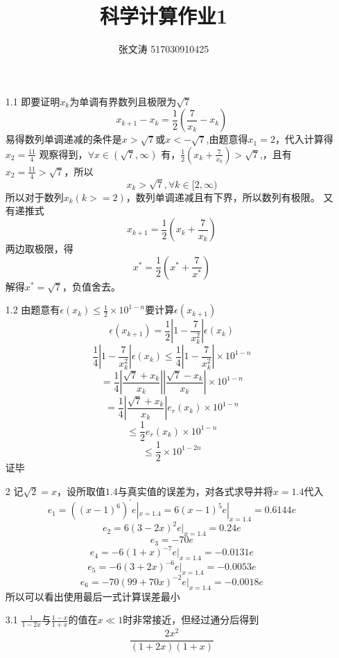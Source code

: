 \documentclass[UTF-8]{ctexart}
\title{科学计算作业1}
\author{张文涛 517030910425}
\begin{document}
	\maketitle
	\begin{itemize}
		\item[1.1]即要证明${x_k}$为单调有界数列且极限为$\sqrt{7}$\[ x_{k+1} - x_k  = \frac{1}{2}( \frac{7}{x_k} - x_k)\]
		易得数列单调递减的条件是$x>\sqrt{7}$或$x<-\sqrt{7}$,由题意得$x_1 = 2$，代入计算得$x_2 = \frac{11}{4}$\newline
		观察得到，$\forall x \in (\sqrt{7}, \infty)$ 有，$\frac{1}{2}(x_k +\frac{7}{x_k}) > \sqrt{7}$,，且有$x_2 = \frac{11}{4} > \sqrt{7}$，所以\[x_k > \sqrt{7}, \forall k \in [2, \infty)\]所以对于数列$x_k(k >= 2)$，数列单调递减且有下界，所以数列有极限。\newline
		又有递推式\[x_{k+1} = \frac{1}{2}(x_k + \frac{7}{x_k})\]
		两边取极限，得
		\[x^{*} = \frac{1}{2}(x^{*} +\frac{7}{x^{*}})\]
		解得$x^{*} = \sqrt{7}$，负值舍去。\newline\newline
		\item[1.2]由题意有$\epsilon(x_k) \le \frac{1}{2} \times 10^{1-n}$要计算$\epsilon(x_{k+1})$\newline
		\[\epsilon(x_{k+1}) = \frac{1}{2}\left|1 - \frac{7}{x_{k}^{2}}\right|\epsilon(x_k)\]
		\[ \frac{1}{4}\left|1 - \frac{7}{x_{k}^{2}}\right|\epsilon(x_k) \le  \frac{1}{4}\left|1 - \frac{7}{x_{k}^{2}}\right| \times 10^{1-n}\]
		\[ = \frac{1}{4}\left|\frac{\sqrt{7} + x_{k}}{x_k}\right| \left|\frac{\sqrt{7} - x_{k}}{x_k}\right| \times 10^{1-n}\]
		\[ = \frac{1}{4}\left|\frac{\sqrt{7} + x_{k}}{x_k}\right| e_{r}(x_k) \times 10^{1-n}\]
		\[\le \frac{1}{2} e_{r}(x_k)\times 10^{1-n}\]
		\[\le \frac{1}{2} \times 10^{1-2n}\]
		证毕\newline\newline
		\item[2] 记$\sqrt{2} = x$，设所取值$1.4$与真实值的误差为，对各式求导并将$x = 1.4$代入
		\[e_1 = ((x - 1)^6)^{'}e|_{x = 1.4} = 6(x - 1)^5e|_{x = 1.4} = 0.6144e\]
		\[e_2 = 6(3 - 2x)^2e|_{x = 1.4} = 0.24e\]
		\[e_3 = -70e\]
		\[e_4 = -6(1 + x)^{-7}e|_{x = 1.4} = -0.0131e\]
		\[e_5 = -6(3 + 2x)^{-6}e|_{x = 1.4} = -0.0053e\]
		\[e_6 = -70(99 + 70x)^{-2}e|_{x = 1.4} = -0.0018e\]
		所以可以看出使用最后一式计算误差最小\newline\newline
		\item[3.1]$\frac{1}{1 - 2x}$与$\frac{1-x}{1 + x}$的值在$x\ll 1$时非常接近，但经过通分后得到
		\[\frac{2x^{2}}{(1 + 2x)(1 + x)}\]

\end{itemize}
\end{document}
